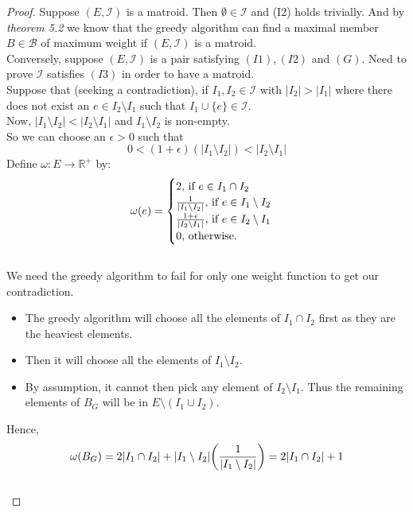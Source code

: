 \documentclass[../main.tex]{subfiles}
\begin{document}
\begin{proof}
Suppose $(E,\mathcal{I})$ is a matroid. Then $\emptyset \in \mathcal{I}$ and (I2) holds trivially.
And by \textit{theorem 5.2} we know that the greedy algorithm can find a maximal member $B \in \mathcal{B}$ of maximum weight if $(E,\mathcal{I})$ is a matroid.\\
Conversely, suppose $(E,\mathcal{I})$ is a pair satisfying $(I1),(I2)$ and $(G).$ Need to prove $\mathcal{I}$ satisfies $(I3)$ in order to have a matroid.\\
Suppose that (seeking a contradiction), if $I_1,I_2 \in \mathcal{I}$ with $|I_2|>|I_1|$ where there does not exist an $e \in I_2 \setminus I_1$ such that $I_1 \cup \{e\} \in \mathcal{I}.$\\
Now, $|I_1 \setminus I_2| < |I_2 \setminus I_1|$ and $I_1 \setminus I_2$ is non-empty.\\
So we can choose an $\epsilon>0$ such that
\begin{equation}
0 < (1+\epsilon)(|I_1 \setminus I_2|) < |I_2 \setminus I_1|
\end{equation}
Define $\omega:E \longrightarrow \mathbb{R^+}$ by:
\[
\omega(e) = \begin{cases}
               2 ,$ if $ e \in I_1 \cap I_2 \\
               \frac{1}{|I_1 \setminus I_2|} ,$ if $ e \in I_1 \setminus I_2\\
               \frac{1+\epsilon}{|I_2 \setminus I_1|},$ if $ e \in I_2 \setminus I_1 \\
               0, $ otherwise.$
            \end{cases}
\]\\
We need the greedy algorithm to fail for only one weight function to get our contradiction.
\begin{itemize}
\item The greedy algorithm will choose all the elements of $I_1 \cap I_2$ first as they are the heaviest elements.
\item Then it will choose all the elements of $I_1 \setminus I_2.$
\item By assumption, it cannot then pick any element of $I_2 \setminus I_1.$ Thus the remaining elements of $B_G$ will be in $E \setminus (I_1 \cup I_2).$\\
\end{itemize}
Hence,\[
\omega(B_G) = 2|I_1 \cap I_2| + |I_1 \setminus I_2| \bigg( \frac{1}{|I_1 \setminus I_2|} \bigg) \\
= 2|I_1 \cap I_2| + 1
\]\\

\end{proof}
\end{document}
